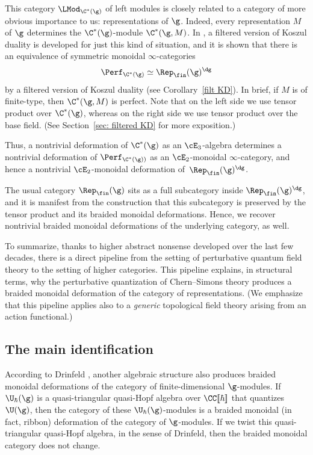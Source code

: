 \documentclass[10pt]{amsart}
\begin{document}
This category $\LMod_{\C^*(\g)}$ of left modules is closely related to a category of more obvious importance to us: representations of $\g$.
Indeed, every representation $M$ of $\g$ determines the $\C^*(\g)$-module $\C^*(\g,M)$.
In \cite{CosYang}, a filtered version of Koszul duality is developed for just this kind of situation,
and it is shown that there is an equivalence of symmetric monoidal $\infty$-categories 
\begin{equation}
\label{filtKD}
\Perf_{\C^*(\g)} \simeq \Rep_\fin(\g)^{\dg}
\end{equation}
by a filtered version of Koszul duality (see Corollary~\ref{filt KD}).
In brief, if $M$ is of finite-type, then $\C^*(\g,M)$ is perfect.
Note that on the left side we use tensor product over $\C^*(\g)$, 
whereas on the right side we use tensor product over the base field.
(See Section~\ref{sec: filtered KD} for more exposition.)

Thus, a nontrivial deformation of $\C^*(\g)$ as an $\cE_3$-algebra
determines a nontrivial deformation of $\Perf_{\C^*(\g))}$ as an $\cE_2$-monoidal $\infty$-category,
and hence a nontrivial $\cE_2$-monoidal deformation of~$\Rep_\fin(\g)^{\dg}$.

The usual category $\Rep_\fin(\g)$ sits as a full subcategory inside $\Rep_\fin(\g)^{\dg}$, 
and it is manifest from the construction that this subcategory is preserved by the tensor product and its braided monoidal deformations.
Hence, we recover nontrivial braided monoidal deformations of the underlying category, as well.

To summarize, thanks to higher abstract nonsense developed over the last few decades,
there is a direct pipeline from the setting of perturbative quantum field theory to the setting of higher categories.
This pipeline explains, in structural terms, why the perturbative quantization of Chern--Simons theory produces a braided monoidal deformation of the category of representations.
(We emphasize that this pipeline applies also to a {\em generic} topological field theory arising from an action functional.)

\subsection{The main identification}

According to Drinfeld \cite{DriACHA,DriQHA}, another algebraic structure also produces braided monoidal deformations of the category of finite-dimensional $\g$-modules. 
If $\U_{\hbar}(\g)$ is a quasi-triangular quasi-Hopf algebra over $\CC[\![\hbar]\!]$ that quantizes $\U(\g)$, then the category of these $\U_{\hbar}(\g)$-modules is a braided monoidal (in fact, ribbon) deformation of the category of $\g$-modules.  
If we twist this quasi-triangular quasi-Hopf algebra, in the sense of Drinfeld,
then the braided monoidal category does not change.
\end{document}
